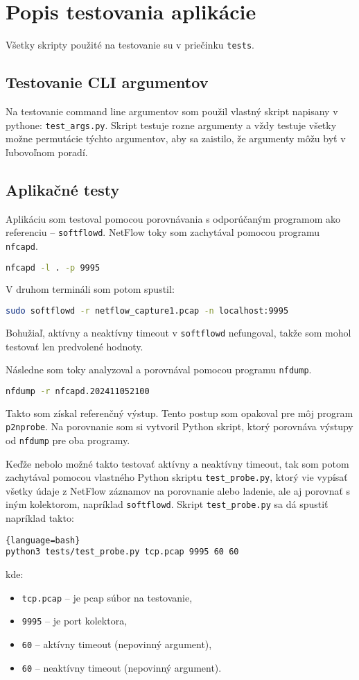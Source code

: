 \documentclass[a4paper, 12pt]{article}
\begin{document}
\newpage
\section{Popis testovania aplikácie}

Všetky skripty použité na testovanie su v priečinku \texttt{tests}.

\subsection{Testovanie CLI argumentov}
Na testovanie command line argumentov som použil vlastný skript napisany v pythone: \texttt{test\_args.py}.
Skript testuje rozne argumenty a vždy testuje všetky možne permutácie týchto argumentov, aby sa zaistilo, že argumenty môžu byť v ľubovoľnom poradí.

\subsection{Aplikačné testy}
Aplikáciu som testoval pomocou porovnávania s odporúčaným programom ako referenciu -- \texttt{softflowd}\cite{softflowd}. NetFlow toky som zachytával pomocou programu \texttt{nfcapd}.
\begin{lstlisting}[language=bash]
nfcapd -l . -p 9995        
\end{lstlisting}
V druhom termináli som potom spustil:
\begin{lstlisting}[language=bash]
sudo softflowd -r netflow_capture1.pcap -n localhost:9995
\end{lstlisting}
Bohužiaľ, aktívny a neaktívny timeout v \texttt{softflowd} nefungoval, takže som mohol testovať len predvolené hodnoty.

Následne som toky analyzoval a porovnával pomocou programu \texttt{nfdump}.

\begin{lstlisting}[language=bash]
nfdump -r nfcapd.202411052100
\end{lstlisting}
Takto som získal referenčný výstup. Tento postup som opakoval pre môj program \texttt{p2nprobe}. Na porovnanie som si vytvoril Python skript, ktorý porovnáva výstupy od \texttt{nfdump} pre oba programy.

Keďže nebolo možné takto testovať aktívny a neaktívny timeout, tak som potom zachytával pomocou vlastného Python skriptu \texttt{test\_probe.py}, ktorý vie vypísať všetky údaje z NetFlow záznamov na porovnanie alebo ladenie, ale aj porovnať s iným kolektorom, napríklad \texttt{softflowd}. Skript \texttt{test\_probe.py} sa dá spustiť napríklad takto:
\begin{lstlisting}{language=bash}
python3 tests/test_probe.py tcp.pcap 9995 60 60
\end{lstlisting}
kde:
\begin{itemize}
    \item \texttt{tcp.pcap} -- je pcap súbor na testovanie,
    \item \texttt{9995} -- je port kolektora,
    \item \texttt{60} -- aktívny timeout (nepovinný argument),
    \item \texttt{60} -- neaktívny timeout (nepovinný argument).
\end{itemize}
\end{document}
